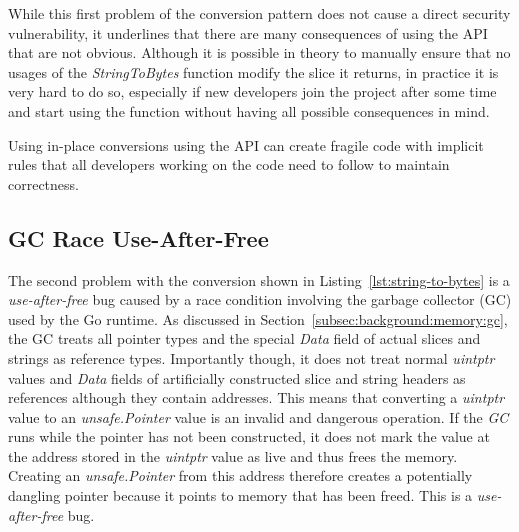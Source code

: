 While this first problem of the conversion pattern does not cause a direct security vulnerability, it underlines that
there are many consequences of using the \unsafe{} \acrshort{API} that are not obvious.
Although it is possible in theory to manually ensure that no usages of the \textit{StringToBytes} function modify the
slice it returns, in practice it is very hard to do so, especially if new developers join the project after some time
and start using the function without having all possible consequences in mind.

\begin{insight}
    Using in-place conversions using the \unsafe{} API can create fragile code with implicit rules that all developers
    working on the code need to follow to maintain correctness.
\end{insight}



\subsection{GC Race Use-After-Free}\label{subsec:unsafe-security-problems:slice-casts:gc-race}

The second problem with the conversion shown in Listing~\ref{lst:string-to-bytes} is a \textit{use-after-free} bug
caused by a race condition involving the garbage collector (\acrshort{GC}) used by the Go runtime.
As discussed in Section~\ref{subsec:background:memory:gc}, the \acrshort{GC} treats all pointer types and the special
\textit{Data} field of actual slices and strings as reference types.
Importantly though, it does not treat normal \textit{uintptr} values and \textit{Data} fields of artificially
constructed slice and string headers as references although they contain addresses.
This means that converting a \textit{uintptr} value to an \textit{unsafe.Pointer} value is an invalid and dangerous
operation.
If the \textit{GC} runs while the pointer has not been constructed, it does not mark the value at the address
stored in the \textit{uintptr} value as live and thus frees the memory.
Creating an \textit{unsafe.Pointer} from this address therefore creates a potentially dangling pointer because it points
to memory that has been freed.
This is a \textit{use-after-free} bug.

